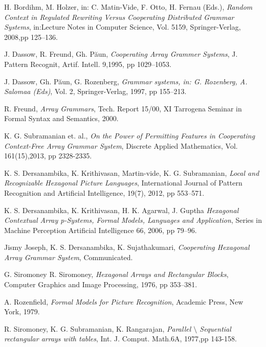 \documentclass[11pt]{article}
\begin{document}
 \begin{thebibliography}{99}

 H. Bordihm, M. Holzer, in: C. Matin-Vide, F. Otto, H. Fernau (Eds.), \textit{Random Context in Regulated Rewriting Versus Cooperating Distributed Grammar Systems}, in:Lecture Notes in Computer Science, Vol. 5159, Springer-Verlag, 2008,pp 125--136.

J. Dassow, R. Freund, Gh. P\u aun, \textit{Cooperating Array Grammer Systems}, J. Pattern Recognit, Artif. Intell. 9,1995, pp 1029--1053.

J. Dassow, Gh. P\u aun, G. Rozenberg, \textit{Grammar systems, in: G. Rozenberg, A. Salomaa (Eds)}, Vol. 2, Springer-Verlag, 1997, pp 155--213.

R. Freund, \textit{Array Grammars}, Tech. Report 15/00, XI Tarrogena Seminar in Formal Syntax and Semantics, 2000.

K. G. Subramanian et. al., \textit{On the Power of Permitting Features in Cooperating Context-Free Array Grammar
System}, Discrete Applied Mathematics, Vol. 161(15),2013, pp
2328-2335.

K. S. Dersanambika, K. Krithivasan, Martin-vide, K. G. Subramanian, \textit{Local and Recognizable Hexagonal Picture Languages}, International Journal of Pattern Recognition and Artificial Intelligence, 19(7), 2012, pp 553--571.

K. S. Dersanambika, K. Krithivasan, H. K. Agarwal, J. Guptha \textit{Hexagonal Contextual Array p-Systems, Formal Models, Languages and Application}, Series in Machine Perception Artificial Intelligence 66, 2006, pp 79--96.

Jismy Joseph, K. S. Dersanambika, K. Sujathakumari, \textit{Cooperating Hexagonal Array Grammar System}, Communicated.

G. Siromoney R. Siromoney, \textit{Hexagonal Arrays and Rectangular Blocks}, Computer Graphics and Image Processing, 1976, pp 353--381.

A. Rozenfield, \textit{Formal Models for Picture Recognition}, Academic Press, New York, 1979.

 R. Siromoney, K. G. Subramanian, K. Rangarajan,
\textit{Parallel $\setminus$ Sequential rectangular arrays with
tables}, Int. J. Comput. Math.6A, 1977,pp 143-158.

\end{thebibliography}
\end{document}
